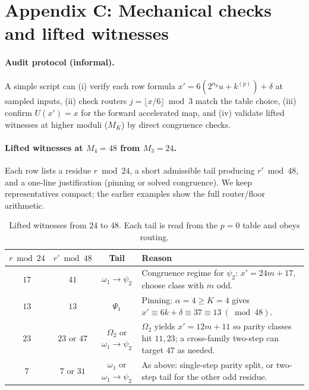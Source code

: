 \documentclass[11pt,letterpaper]{amsart}
\theoremstyle{definition}
\theoremstyle{plain}
\theoremstyle{plain}
\theoremstyle{remark}
\begin{document}
\newpage
\section*{Appendix C: Mechanical checks and lifted witnesses}\label{app:checks}

\paragraph{Audit protocol (informal).}
A simple script can (i) verify each row formula $x'=6(2^{\alpha_p}u+k^{(p)})+\delta$ at sampled inputs, (ii) check routers $j=\lfloor x/6\rfloor\bmod 3$ match the table choice, (iii) confirm $U(x')=x$ for the forward accelerated map, and (iv) validate lifted witnesses at higher moduli ($M_K$) by direct congruence checks.

\paragraph{Lifted witnesses at $M_4=48$ from $M_3=24$.}
Each row lists a residue $r\bmod 24$, a short admissible tail producing $r'\bmod 48$, and a one-line justification (pinning or solved congruence). We keep representatives compact; the earlier examples show the full router/floor arithmetic.

\begin{table}[!htbp]
\centering
\caption{Lifted witnesses from $24$ to $48$. Each tail is read from the $p{=}0$ table and obeys routing.}
\label{tab:lift-24-to-48}
\begin{tabularx}{\linewidth}{@{}c c c X@{}}
\toprule
$r\bmod 24$ & $r'\bmod 48$ & Tail & Reason \\ \midrule
$17$ & $41$ & $\omega_1\to\psi_2$ & Congruence regime for $\psi_2$: $x'=24m+17$, choose class with $m$ odd.\\
$13$ & $13$ & $\Psi_1$ & Pinning: $\alpha=4\ge K=4$ gives $x'\equiv 6k+\delta\equiv 37\equiv 13\ (\bmod 48)$. \\
$23$ & $23$ or $47$ & $\Omega_2$ or $\omega_1\to\psi_2$ & $\Omega_2$ yields $x'=12m+11$ so parity classes hit $11,23$; a cross-family two-step can target $47$ as needed. \\
$7$ & $7$ or $31$ & $\omega_1$ or $\omega_1\to\psi_2$ & As above: single-step parity split, or two-step tail for the other odd residue. \\
\bottomrule
\end{tabularx}
\end{table}
\end{document}
